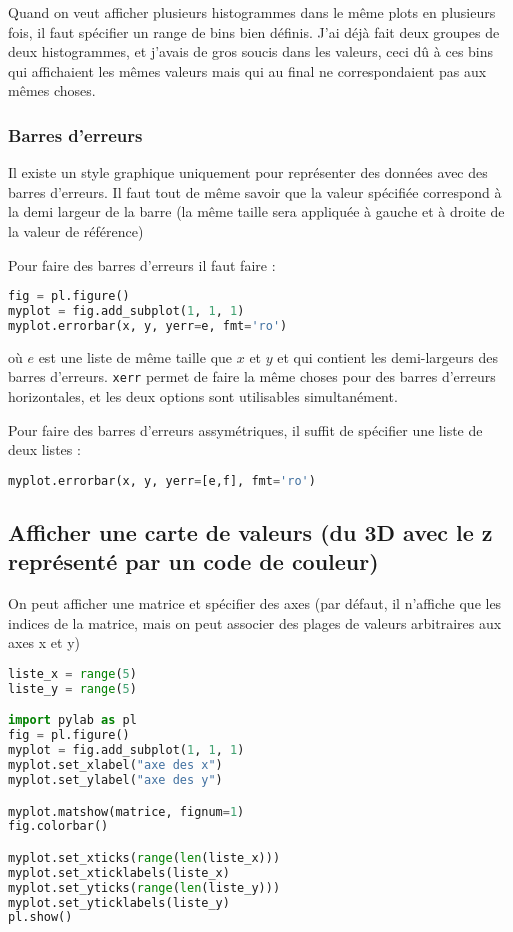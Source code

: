 \documentclass[a4paper,twoside]{article}
\begin{document}
\begin{attention}
Quand on veut afficher plusieurs histogrammes dans le même plots en plusieurs fois, il faut spécifier un range de bins bien définis. J'ai déjà fait deux groupes de deux histogrammes, et j'avais de gros soucis dans les valeurs, ceci dû à ces bins qui affichaient les mêmes valeurs mais qui au final ne correspondaient pas aux mêmes choses.
\end{attention}

\subsubsection{Barres d'erreurs}
Il existe un style graphique uniquement pour représenter des données avec des barres d'erreurs. Il faut tout de même savoir que la valeur spécifiée correspond à la demi largeur de la barre (la même taille sera appliquée à gauche et à droite de la valeur de référence)

Pour faire des barres d'erreurs il faut faire : 
\begin{lstlisting}[language=python]
fig = pl.figure()
myplot = fig.add_subplot(1, 1, 1)
myplot.errorbar(x, y, yerr=e, fmt='ro')
\end{lstlisting}
où $e$ est une liste de même taille que $x$ et $y$ et qui contient les demi-largeurs des barres d'erreurs. \texttt{xerr} permet de faire la même choses pour des barres d'erreurs horizontales, et les deux options sont utilisables simultanément.

\bigskip

Pour faire des barres d'erreurs assymétriques, il suffit de spécifier une liste de deux listes : 
\begin{lstlisting}[language=python]
myplot.errorbar(x, y, yerr=[e,f], fmt='ro')
\end{lstlisting}

\subsection{Afficher une carte de valeurs (du 3D avec le z représenté par un code de couleur)}
On peut afficher une matrice et spécifier des axes (par défaut, il n'affiche que les indices de la matrice, mais on peut associer des plages de valeurs arbitraires aux axes x et y)

\begin{lstlisting}[language=python]
liste_x = range(5)
liste_y = range(5)

import pylab as pl
fig = pl.figure()
myplot = fig.add_subplot(1, 1, 1)
myplot.set_xlabel("axe des x")
myplot.set_ylabel("axe des y")

myplot.matshow(matrice, fignum=1)
fig.colorbar()

myplot.set_xticks(range(len(liste_x)))
myplot.set_xticklabels(liste_x)
myplot.set_yticks(range(len(liste_y)))
myplot.set_yticklabels(liste_y)
pl.show()
\end{lstlisting}
\end{document}
